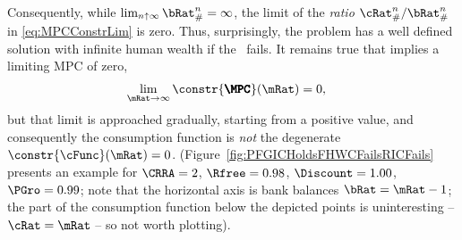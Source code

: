 \documentclass[\econtexRoot/BufferStockTheory]{subfiles}
\begin{document}
Consequently, while $\lim_{n \uparrow \infty} \bRat_{\#}^{n} = \infty$, the limit of the \textit{ratio} $\cRat_{\#}^{n}/\bRat_{\#}^{n}$ in \eqref{eq:MPCConstrLim} is zero.
Thus, surprisingly, the problem has a well defined solution with
infinite human wealth if the \RIC~fails.  It remains true that \cncl{\RIC}
implies a limiting MPC of zero,
\begin{equation}\begin{gathered}\begin{aligned}
  \lim_{\mRat \rightarrow \infty} \constr{\pmb{\MPC}}(\mRat)   & = 0,
\end{aligned}\end{gathered}\end{equation}
but that limit is approached gradually, starting from a positive
value, and consequently the consumption function is {\it not} the
degenerate $\constr{\cFunc}(\mRat)=0$.  (Figure~\ref{fig:PFGICHoldsFHWCFailsRICFails} presents an example for $\CRRA=2$, $\Rfree=0.98$, $\Discount = 1.00$, $\PGro = 0.99$; note that the horizontal axis is bank balances $\bRat = \mRat-1$; the part of the consumption function below the depicted points is uninteresting -- $\cRat = \mRat$ -- so not worth plotting).


% 

\end{document}
